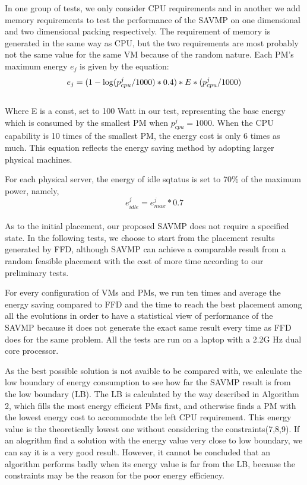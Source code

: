 \documentclass[10pt, conference, compsocconf]{IEEEtran}
\begin{document}
In one group of tests, we only consider CPU requirements and in another we add
memory requirements to test the performance of the SAVMP on one dimensional and
two dimensional packing respectively. The requirement of memory is generated in
the same way as CPU, but the two requirements are most probably not the same
value for the same VM because of the random nature.
Each PM's maximum energy $e_j$ is given by the equation:\\
\begin{equation}\label{13}
e_j=(1-\log (p_{cpu}^j/1000)*0.4)*E*(p_{cpu}^j/1000) \\
\end{equation} \\

Where E is a const, set to 100 Watt in our test, representing the base energy
which is consumed by the smallest PM when $p_{cpu}^j=1000$. When the CPU
capability is 10 times of the smallest PM, the energy cost is only 6 times as
much. This equation reflects the energy saving method by adopting larger
physical machines.

For each physical server, the energy of idle sqtatus is set to 70\% of the
 maximum power, namely,\\
 \begin{equation}\label{14}
e_{idle}^j= e_{max}^j*0.7
\end{equation} \\

As to the initial placement, our proposed SAVMP does not require a specified
state. In the following tests, we choose to start from the placement results
generated by FFD, although SAVMP can achieve a comparable result from a random
feasible placement with the cost of more time according to our preliminary
tests.

For every configuration of VMs and PMs, we run ten times and average the energy
saving compared to FFD and the time to reach the best placement among all the
evolutions in order to have a statistical view of performance of the SAVMP
because it does not generate the exact same result every time as FFD does for
the same problem. All the tests are run on a laptop with a 2.2G Hz dual core
processor.

As the best possible solution is not avaible to be compared with, we calculate
the low boundary of energy consumption to see how far the SAVMP result is from
the low boundary (LB). The LB is calculated by the way described in Algorithm 2,
which fills the most energy efficient PMs first, and otherwise finds a PM with
the lowest energy cost to accommodate the left CPU requirement. This energy
value is the theoretically lowest one without considering the
constraints(7,8,9). If an alogrithm find a solution with the energy value very
close to low boundary, we can say it is a very good result. However, it cannot
be concluded that an algorithm performs badly when its energy value is far from
the LB, because the constraints may be the reason for the poor energy
efficiency.
\end{document}

